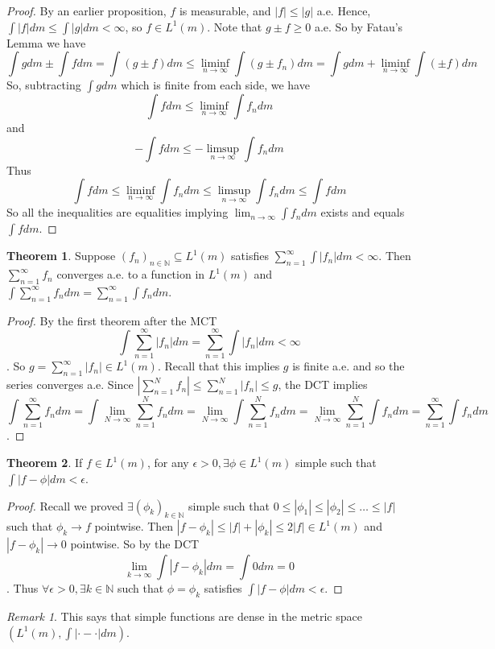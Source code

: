 \documentclass{article}
\theoremstyle{definition}
\newtheorem{theorem}{Theorem}[section]
\theoremstyle{remark}
\newtheorem*{remark}{Remark}
\theoremstyle{remark}
\def\naturals{{\mathbb N}}
\begin{document}
\begin{proof}
By an earlier proposition, $f$ is measurable, and $|f| \leq |g|$ a.e. Hence, $\int |f|dm \leq \int |g|dm < \infty$, so $f \in L^1(m)$. Note that $g \pm f \geq 0$ a.e. So by Fatau's Lemma we have
$$\int g dm \pm \int f dm = \int (g \pm f) dm \leq \liminf_{n\to\infty} \int (g\pm f_n) dm = \int g dm + \liminf_{n\to\infty} \int (\pm f) dm$$
So, subtracting $\int g dm$ which is finite from each side, we have $$\int f dm \leq \liminf_{n\to\infty} \int f_n dm$$ and
$$-\int f dm \leq -\limsup_{n\to\infty}\int f_n dm$$
Thus $$\int f dm \leq \liminf_{n\to\infty} \int f_n dm \leq \limsup_{n\to\infty} \int f_n dm \leq \int f dm$$
So all the inequalities are equalities implying $\lim_{n\to\infty} \int f_n dm$ exists and equals $\int f dm$. 
\end{proof}
\begin{theorem}
Suppose $(f_n)_{n\in\naturals}\subseteq L^1(m)$ satisfies $\sum_{n=1}^\infty \int |f_n|dm < \infty$. Then $\sum_{n=1}^\infty f_n$ converges a.e. to a function in $L^1(m)$ and $\int \sum_{n=1}^\infty f_n dm = \sum_{n=1}^\infty \int f_n dm$. 
\end{theorem}
\begin{proof}
By the first theorem after the MCT
$$\int \sum_{n=1}^\infty |f_n| dm = \sum_{n=1}^\infty \int |f_n| dm < \infty$$. 
So $g = \sum_{n=1}^\infty |f_n| \in L^1(m)$. Recall that this implies $g$ is finite a.e. and so the series converges a.e. Since $|\sum_{n=1}^N f_n| \leq \sum_{n=1}^N |f_n| \leq g$, the DCT implies
$$\int \sum_{n=1}^\infty f_n dm = \int \lim_{N\to\infty} \sum_{n=1}^N f_n dm = \lim_{N\to\infty} \int \sum_{n=1}^N f_n dm = \lim_{N\to\infty} \sum_{n=1}^N \int f_n dm = \sum_{n=1}^\infty \int f_n dm$$.
\end{proof}
\begin{theorem}
If $f \in L^1(m)$, for any $\epsilon > 0, \exists \phi \in L^1(m)$ simple such that $\int |f - \phi| dm < \epsilon$.
\end{theorem}
\begin{proof}
Recall we proved $\exists (\phi_k)_{k\in\naturals}$ simple such that $0 \leq |\phi_1| \leq |\phi_2| \leq \dots \leq |f|$ such that $\phi_k \to f$ pointwise. Then $|f - \phi_k| \leq |f| + |\phi_k| \leq 2|f| \in L^1(m)$ and $|f - \phi_k| \to 0$ pointwise. So by the DCT
$$\lim_{k\to\infty} \int |f - \phi_k|dm = \int 0 dm = 0$$. Thus $\forall \epsilon > 0, \exists k\in\naturals$ such that $\phi=\phi_k$ satisfies $\int | f- \phi| dm < \epsilon$.
\end{proof}
\begin{remark}
This says that simple functions are dense in the metric space $(L^1(m), \int|\cdot - \cdot| dm)$.
\end{remark}
\end{document}
